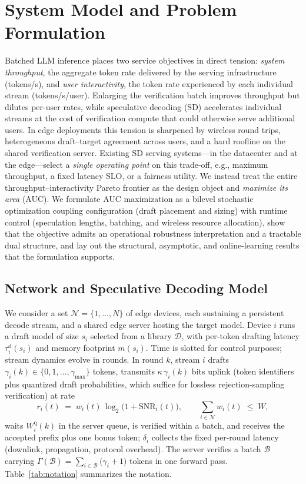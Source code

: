 \documentclass[11pt]{article}
\theoremstyle{definition}
\theoremstyle{remark}
\newcommand{\cN}{\mathcal{N}}
\newcommand{\cB}{\mathcal{B}}
\newcommand{\cD}{\mathcal{D}}
\begin{document}
\section{System Model and Problem Formulation}\label{sec:formulation}

Batched LLM inference places two service objectives in direct tension:
\emph{system throughput}, the aggregate token rate delivered by the serving
infrastructure (tokens/s), and \emph{user interactivity}, the token rate
experienced by each individual stream (tokens/s/user). Enlarging the
verification batch improves throughput but dilutes per-user rates, while
speculative decoding (SD) accelerates individual streams at the cost of
verification compute that could otherwise serve additional users. In edge
deployments this tension is sharpened by wireless round trips, heterogeneous
draft--target agreement across users, and a hard roofline on the shared
verification server. Existing SD serving systems---in the datacenter and at
the edge---select a \emph{single operating point} on this trade-off, e.g.,
maximum throughput, a fixed latency SLO, or a fairness utility. We instead
treat the entire throughput--interactivity Pareto frontier as the design
object and \emph{maximize its area} (AUC). We formulate AUC maximization as a
bilevel stochastic optimization coupling configuration (draft placement and
sizing) with runtime control (speculation lengths, batching, and wireless
resource allocation), show that the objective admits an operational
robustness interpretation and a tractable dual structure, and lay out the
structural, asymptotic, and online-learning results that the formulation
supports.

\subsection{Network and Speculative Decoding Model}\label{ssec:model}

We consider a set $\cN=\{1,\dots,N\}$ of edge devices, each sustaining a
persistent decode stream, and a shared edge server hosting the target model.
Device $i$ runs a draft model of size $s_i$ selected from a library $\cD$,
with per-token drafting latency $\tau_i^{\mathrm{d}}(s_i)$ and memory
footprint $m(s_i)$. Time is slotted for control purposes; stream dynamics
evolve in rounds. In round $k$, stream $i$ drafts
$\gamma_i(k)\in\{0,1,\dots,\gamma_{\max}\}$ tokens, transmits
$\kappa\,\gamma_i(k)$ bits uplink (token identifiers plus quantized draft
probabilities, which suffice for lossless rejection-sampling verification) at
rate
\begin{equation}\label{eq:rate-wireless}
r_i(t)\;=\;w_i(t)\,\log_2\!\bigl(1+\mathrm{SNR}_i(t)\bigr),
\qquad \textstyle\sum_{i\in\cN} w_i(t)\;\le\; W,
\end{equation}
waits $W_i^{\mathrm{q}}(k)$ in the server queue, is verified within a batch,
and receives the accepted prefix plus one bonus token; $\delta_i$ collects the
fixed per-round latency (downlink, propagation, protocol overhead). The
server verifies a batch $\cB$ carrying
$\Gamma(\cB)=\sum_{i\in\cB}\bigl(\gamma_i+1\bigr)$ tokens in one forward pass.
Table~\ref{tab:notation} summarizes the notation.
\end{document}
